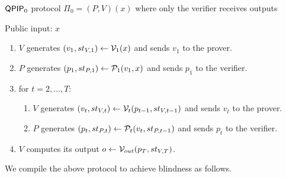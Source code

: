 \begin{protocol}{$\operatorname{\mathsf{QPIP}}_0$ protocol $\Pi_0=(P, V)(x)$ where only the verifier receives outputs}
	
	Public input: $x$
	\begin{enumerate}
		\item $V$ generates $(v_1, st_{V, 1})\leftarrow\mathcal{V}_1(x)$ and sends $v_1$ to the prover.
		\item $P$ generates $(p_1, st_{P, 1})\leftarrow\mathcal{P}_1(v_1, x)$ and sends $p_1$ to the verifier.
		\item for $t=2,\ldots,T$:
		\begin{enumerate}
			\item $V$ generates $(v_t, st_{V, t})\leftarrow\mathcal{V}_t(p_{t-1}, st_{V, t-1})$ and sends $v_t$ to the prover.
			\item $P$ generates $(p_t, st_{P, t})\leftarrow\mathcal{P}_t(v_t, st_{P, t-1})$ and sends $p_t$ to the verifier.
		\end{enumerate}
		\item $V$ computes its output $o\leftarrow\mathcal{V}_{out}(p_T, st_{V, T})$.
	\end{enumerate}

\end{protocol}

We compile the above protocol to achieve blindness as follows.

